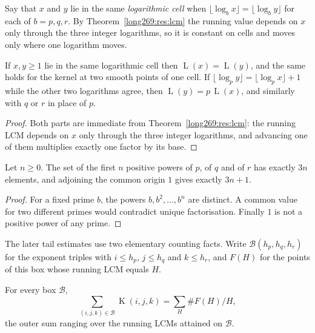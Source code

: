\documentclass[11pt]{article}
\theoremstyle{remark}
\theoremstyle{plain}
\newcommand{\Lprefix}{\operatorname{L}}
\newcommand{\Kernel}{\operatorname{K}}
\begin{document}
Say that $x$ and $y$ lie in the same \emph{logarithmic cell} when
$\lfloor\log_b x\rfloor=\lfloor\log_b y\rfloor$ for each of $b=p,q,r$.  By Theorem~\ref{long269:res:lcm} the running value depends on $x$ only
through the three integer logarithms, so it is constant on cells and moves only
where one logarithm moves.

\begin{proposition}\label{long269:res:cell}
If $x,y\ge1$ lie in the same logarithmic cell then $\Lprefix(x)=\Lprefix(y)$,
and the same holds for the kernel at two smooth points of one cell.  If
$\lfloor\log_p y\rfloor=\lfloor\log_p x\rfloor+1$ while the other two
logarithms agree, then $\Lprefix(y)=p\,\Lprefix(x)$, and similarly with $q$ or
$r$ in place of $p$.
\end{proposition}

\begin{proof}
Both parts are immediate from Theorem~\ref{long269:res:lcm}: the running LCM depends on $x$
only through the three integer logarithms, and advancing one of them multiplies
exactly one factor by its base.
\end{proof}

\label{long269:res:jump}

\begin{proposition}\label{long269:res:count}
Let $n\ge0$.  The set of the first $n$ positive powers of $p$, of $q$ and of
$r$ has exactly $3n$ elements, and adjoining the common origin $1$ gives
exactly $3n+1$.
\end{proposition}

\begin{proof}
For a fixed prime $b$, the powers $b,b^{2},\ldots,b^{n}$ are distinct.
A common value for two different primes would contradict unique
factorisation.  Finally $1$ is not a
positive power of any prime.
\end{proof}


The later tail estimates use two elementary counting facts.  Write
$\mathcal B(h_p,h_q,h_r)$ for the exponent triples with
$i\le h_p$, $j\le h_q$ and $k\le h_r$, and $F(H)$ for the points of this
box whose running LCM equals $H$.

\begin{proposition}\label{long269:res:fibre}
For every box $\mathcal B$,
\[
 \sum_{(i,j,k)\in\mathcal B}\Kernel(i,j,k)=\sum_{H}\#F(H)/H,
\]
the outer sum ranging over the running LCMs attained on $\mathcal B$.
\end{proposition}
\end{document}
